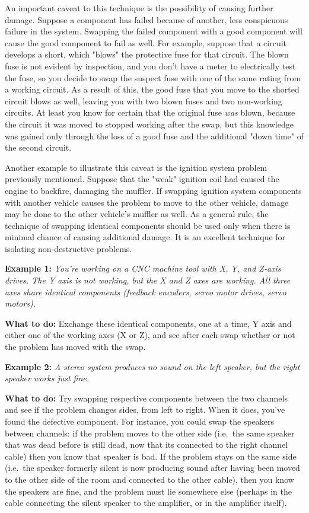 An important caveat to this technique is the possibility of causing
further damage. Suppose a component has failed because of another, less
conspicuous failure in the system. Swapping the failed component with a
good component will cause the good component to fail as well. For
example, suppose that a circuit develops a short, which "blows" the
protective fuse for that circuit. The blown fuse is not evident by
inspection, and you don't have a meter to electrically test the fuse, so
you decide to swap the suspect fuse with one of the same rating from a
working circuit. As a result of this, the good fuse that you move to the
shorted circuit blows as well, leaving you with two blown fuses and two
non-working circuits. At least you know for certain that the original
fuse {\em was} blown, because the circuit it was moved to stopped
working after the swap, but this knowledge was gained only through the
loss of a good fuse and the additional "down time" of the second
circuit.

Another example to illustrate this caveat is the ignition system problem
previously mentioned. Suppose that the "weak" ignition coil had caused
the engine to backfire, damaging the muffler. If swapping ignition
system components with another vehicle causes the problem to move to the
other vehicle, damage may be done to the other vehicle's muffler as
well. As a general rule, the technique of swapping identical components
should be used only when there is minimal chance of causing additional
damage. It is an excellent technique for isolating non-destructive
problems.

{\bf Example 1:} {\em You're working on a CNC machine tool with X, Y,
and Z-axis drives. The Y axis is not working, but the X and Z axes are
working. All three axes share identical components (feedback encoders,
servo motor drives, servo motors).}

{\bf What to do:} Exchange these identical components, one at a time, Y
axis and either one of the working axes (X or Z), and see after each
swap whether or not the problem has moved with the swap.

{\bf Example 2:} {\em A stereo system produces no sound on the left
speaker, but the right speaker works just fine.}

{\bf What to do:} Try swapping respective components between the two
channels and see if the problem changes sides, from left to right. When
it does, you've found the defective component. For instance, you could
swap the speakers between channels: if the problem moves to the other
side (i.e.~the same speaker that was dead before is still dead, now that
its connected to the right channel cable) then you know that speaker is
bad. If the problem stays on the same side (i.e.~the speaker formerly
silent is now producing sound after having been moved to the other side
of the room and connected to the other cable), then you know the
speakers are fine, and the problem must lie somewhere else (perhaps in
the cable connecting the silent speaker to the amplifier, or in the
amplifier itself).

